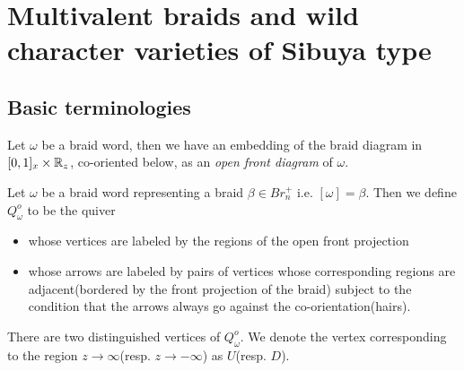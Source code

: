 \chapter{Multivalent braids and wild character varieties of Sibuya type}
\section{Basic terminologies} 
\begin{definition}
Let $\omega$ be a braid word, then we have an embedding of the braid diagram in $[0,1]_x \times \mathbb{R}_z$, co-oriented below, as an \emph{open front diagram} of $\omega$.
\end{definition}
\begin{definition}
	Let $\omega$ be a braid word representing a braid $\beta\in Br_n^+$ i.e. $[\omega] = \beta$. Then we define $Q^o_{\omega}$ to be the quiver 
\begin{itemize}
		\item whose vertices are labeled by the regions of the open front projection
		\item whose arrows are labeled by pairs of vertices whose corresponding regions are adjacent(bordered by the front projection of the braid) subject to the condition that the arrows always go against the co-orientation(hairs).
	\end{itemize}
There are two distinguished vertices of $Q^o_\omega$. We denote the vertex corresponding to the region $z\rightarrow \infty$(resp. $z\rightarrow -\infty$) as $U$(resp. $D$).
\end{definition}

